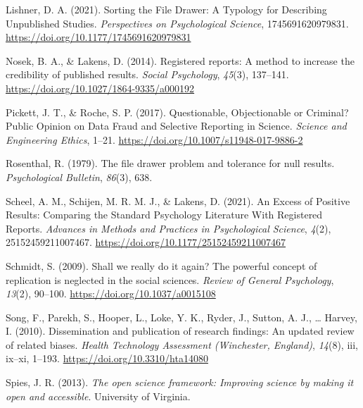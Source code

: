 \documentclass[
  ,jou, a4paper,floatsintext]{apa6}
\newlength{\cslhangindent}
\newlength{\cslentryspacingunit} %
\newenvironment{CSLReferences}[2] %
 {%
  \setlength{\parindent}{0pt}
  \ifodd #1
  \let\oldpar\par
  \def\par{\hangindent=\cslhangindent\oldpar}
  \fi
  \setlength{\parskip}{#2\cslentryspacingunit}
 }%
 {}
\begin{document}
\begin{CSLReferences}{1}{0}
\leavevmode{}%
Lishner, D. A. (2021). Sorting the {File Drawer}: {A Typology} for {Describing Unpublished Studies}. \emph{Perspectives on Psychological Science}, 1745691620979831. \url{https://doi.org/10.1177/1745691620979831}

\leavevmode{}%
Nosek, B. A., \& Lakens, D. (2014). Registered reports: {A} method to increase the credibility of published results. \emph{Social Psychology}, \emph{45}(3), 137--141. \url{https://doi.org/10.1027/1864-9335/a000192}

\leavevmode{}%
Pickett, J. T., \& Roche, S. P. (2017). Questionable, {Objectionable} or {Criminal}? {Public Opinion} on {Data Fraud} and {Selective Reporting} in {Science}. \emph{Science and Engineering Ethics}, 1--21. \url{https://doi.org/10.1007/s11948-017-9886-2}

\leavevmode{}%
Rosenthal, R. (1979). The file drawer problem and tolerance for null results. \emph{Psychological Bulletin}, \emph{86}(3), 638.

\leavevmode{}%
Scheel, A. M., Schijen, M. R. M. J., \& Lakens, D. (2021). An {Excess} of {Positive Results}: {Comparing} the {Standard Psychology Literature With Registered Reports}. \emph{Advances in Methods and Practices in Psychological Science}, \emph{4}(2), 25152459211007467. \url{https://doi.org/10.1177/25152459211007467}

\leavevmode{}%
Schmidt, S. (2009). Shall we really do it again? {The} powerful concept of replication is neglected in the social sciences. \emph{Review of General Psychology}, \emph{13}(2), 90--100. \url{https://doi.org/10.1037/a0015108}

\leavevmode{}%
Song, F., Parekh, S., Hooper, L., Loke, Y. K., Ryder, J., Sutton, A. J., \ldots{} Harvey, I. (2010). Dissemination and publication of research findings: An updated review of related biases. \emph{Health Technology Assessment (Winchester, England)}, \emph{14}(8), iii, ix--xi, 1--193. \url{https://doi.org/10.3310/hta14080}

\leavevmode{}%
Spies, J. R. (2013). \emph{The open science framework: {Improving} science by making it open and accessible}. {University of Virginia}.


\end{CSLReferences}
\end{document}
